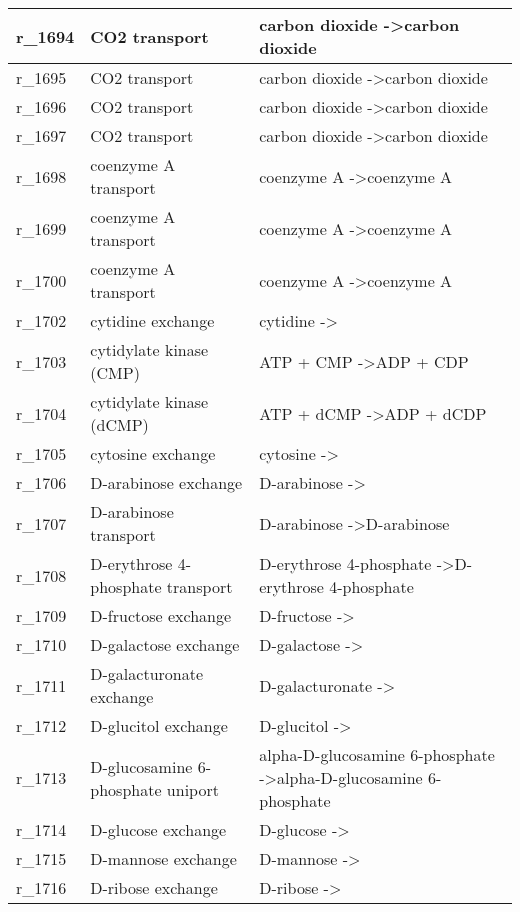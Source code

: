 \begin{landscape}
{\begin{longtable}{|l|p{7cm}|p{15cm}|}
r\_1694 & CO2 transport & carbon dioxide  -\textgreater carbon dioxide \\ \hline
r\_1695 & CO2 transport & carbon dioxide  -\textgreater carbon dioxide \\ \hline
r\_1696 & CO2 transport & carbon dioxide  -\textgreater carbon dioxide \\ \hline
r\_1697 & CO2 transport & carbon dioxide  -\textgreater carbon dioxide \\ \hline
r\_1698 & coenzyme A transport & coenzyme A  -\textgreater coenzyme A \\ \hline
r\_1699 & coenzyme A transport & coenzyme A  -\textgreater coenzyme A \\ \hline
r\_1700 & coenzyme A transport & coenzyme A  -\textgreater coenzyme A \\ \hline
r\_1702 & cytidine exchange & cytidine  -\textgreater{} \\ \hline
r\_1703 & cytidylate kinase (CMP) & ATP + CMP  -\textgreater ADP + CDP \\ \hline
r\_1704 & cytidylate kinase (dCMP) & ATP + dCMP  -\textgreater ADP + dCDP \\ \hline
r\_1705 & cytosine exchange & cytosine  -\textgreater{} \\ \hline
r\_1706 & D-arabinose exchange & D-arabinose  -\textgreater{} \\ \hline
r\_1707 & D-arabinose transport & D-arabinose  -\textgreater D-arabinose \\ \hline
r\_1708 & D-erythrose 4-phosphate transport & D-erythrose 4-phosphate  -\textgreater D-erythrose 4-phosphate \\ \hline
r\_1709 & D-fructose exchange & D-fructose  -\textgreater{} \\ \hline
r\_1710 & D-galactose exchange & D-galactose  -\textgreater{} \\ \hline
r\_1711 & D-galacturonate exchange & D-galacturonate  -\textgreater{} \\ \hline
r\_1712 & D-glucitol exchange & D-glucitol  -\textgreater{} \\ \hline
r\_1713 & D-glucosamine 6-phosphate uniport & alpha-D-glucosamine 6-phosphate  -\textgreater alpha-D-glucosamine 6-phosphate \\ \hline
r\_1714 & D-glucose exchange & D-glucose  -\textgreater{} \\ \hline
r\_1715 & D-mannose exchange & D-mannose  -\textgreater{} \\ \hline
r\_1716 & D-ribose exchange & D-ribose  -\textgreater{} \\ \hline

\end{longtable}}
\end{landscape}
